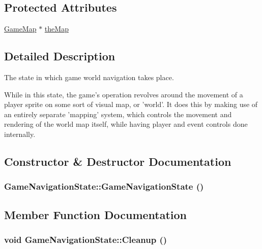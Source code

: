 \subsection*{Protected Attributes}
\begin{CompactItemize}
\item 
\hyperlink{class_game_map}{GameMap} $\ast$ \hyperlink{class_game_navigation_state_83154f9523275696f30c13447e1d74f3}{theMap}
\end{CompactItemize}


\subsection{Detailed Description}
The state in which game world navigation takes place. 

While in this state, the game's operation revolves around the movement of a player sprite on some sort of visual map, or 'world'. It does this by making use of an entirely separate 'mapping' system, which controls the movement and rendering of the world map itself, while having player and event controls done internally. 

\subsection{Constructor \& Destructor Documentation}
\hypertarget{class_game_navigation_state_6a3b93831c85eb5dc3de0a53ca13ddfc}{
\subsubsection[{GameNavigationState}]{\setlength{\rightskip}{0pt plus 5cm}GameNavigationState::GameNavigationState ()}}
\label{class_game_navigation_state_6a3b93831c85eb5dc3de0a53ca13ddfc}




\subsection{Member Function Documentation}
\hypertarget{class_game_navigation_state_f93a7dbb7eac4b14a6d59cbca32b9abd}{
\subsubsection[{Cleanup}]{\setlength{\rightskip}{0pt plus 5cm}void GameNavigationState::Cleanup ()}}
\label{class_game_navigation_state_f93a7dbb7eac4b14a6d59cbca32b9abd}



